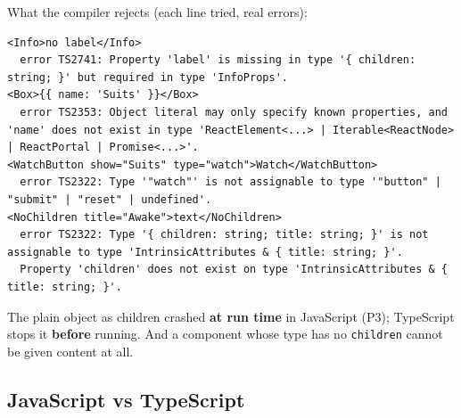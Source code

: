 \documentclass[
  10pt,
]{article}
\newcommand{\passthrough}[1]{#1}
\begin{document}
What the compiler rejects (each line tried, real errors):

\begin{lstlisting}
<Info>no label</Info>
  error TS2741: Property 'label' is missing in type '{ children: string; }' but required in type 'InfoProps'.
<Box>{{ name: 'Suits' }}</Box>
  error TS2353: Object literal may only specify known properties, and 'name' does not exist in type 'ReactElement<...> | Iterable<ReactNode> | ReactPortal | Promise<...>'.
<WatchButton show="Suits" type="watch">Watch</WatchButton>
  error TS2322: Type '"watch"' is not assignable to type '"button" | "submit" | "reset" | undefined'.
<NoChildren title="Awake">text</NoChildren>
  error TS2322: Type '{ children: string; title: string; }' is not assignable to type 'IntrinsicAttributes & { title: string; }'.
  Property 'children' does not exist on type 'IntrinsicAttributes & { title: string; }'.
\end{lstlisting}

The plain object as children crashed \textbf{at run time} in JavaScript
(P3); TypeScript stops it \textbf{before} running. And a component whose
type has no \passthrough{\lstinline!children!} cannot be given content
at all.

\hypertarget{javascript-vs-typescript}{%
\subsection{JavaScript vs TypeScript}\label{javascript-vs-typescript}}
\end{document}

